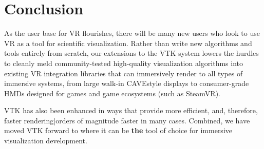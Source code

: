 \section{Conclusion}

As the user base for VR flourishes, there will be many
new users who look to use VR as a tool for scientific visualization.
Rather than write new algorithms and tools entirely from scratch,
our extensions to the VTK system lowers the hurdles to cleanly
meld community-tested high-quality visualization algorithms into
existing VR integration libraries that can immersively render to
all types of immersive systems, from large walk-in CAVE\trademarktext style displays
to consumer-grade HMDs designed for games and game ecosystems (such
as SteamVR).

VTK has also been enhanced in ways that provide more efficient, and,
therefore, faster rendering|orders of magnitude faster in many cases.
Combined, we have moved VTK forward to where it can be \textbf{the}
tool of choice for immersive visualization development.

